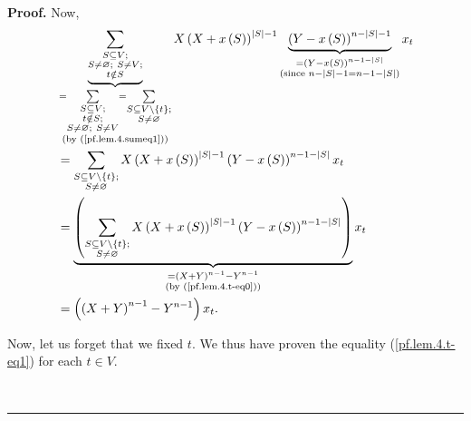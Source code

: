 \documentclass[numbers=enddot,12pt,final,onecolumn,notitlepage]{scrartcl}%
\theoremstyle{definition}
\newenvironment{proof}[1][Proof]{\noindent\textbf{#1.} }{\ \rule{0.5em}{0.5em}}
\let\sumnonlimits\sum
\renewcommand{\sum}{\sumnonlimits\limits}
\newenvironment{verlong}{}{}
\begin{document}
\begin{verlong}
\begin{proof}
Now,%
\begin{align}
&  \underbrace{\sum_{\substack{S\subseteq V;\\S\neq\varnothing;\ S\neq
V;\\t\notin S}}}_{\substack{=\sum_{\substack{S\subseteq V;\\t\notin
S;\\S\neq\varnothing;\ S\neq V}}=\sum_{\substack{S\subseteq V\setminus\left\{
t\right\}  ;\\S\neq\varnothing}}\\\text{(by (\ref{pf.lem.4.sumeq1}))}%
}}X\left(  X+x\left(  S\right)  \right)  ^{\left\vert S\right\vert
-1}\underbrace{\left(  Y-x\left(  S\right)  \right)  ^{n-\left\vert
S\right\vert -1}}_{\substack{=\left(  Y-x\left(  S\right)  \right)
^{n-1-\left\vert S\right\vert }\\\text{(since }n-\left\vert S\right\vert
-1=n-1-\left\vert S\right\vert \text{)}}}x_{t}\nonumber\\
&  =\sum_{\substack{S\subseteq V\setminus\left\{  t\right\}  ;\\S\neq
\varnothing}}X\left(  X+x\left(  S\right)  \right)  ^{\left\vert S\right\vert
-1}\left(  Y-x\left(  S\right)  \right)  ^{n-1-\left\vert S\right\vert }%
x_{t}\nonumber\\
&  =\underbrace{\left(  \sum_{\substack{S\subseteq V\setminus\left\{
t\right\}  ;\\S\neq\varnothing}}X\left(  X+x\left(  S\right)  \right)
^{\left\vert S\right\vert -1}\left(  Y-x\left(  S\right)  \right)
^{n-1-\left\vert S\right\vert }\right)  }_{\substack{=\left(  X+Y\right)
^{n-1}-Y^{n-1}\\\text{(by (\ref{pf.lem.4.t-eq0}))}}}x_{t}\nonumber\\
&  =\left(  \left(  X+Y\right)  ^{n-1}-Y^{n-1}\right)  x_{t}.
\label{pf.lem.4.t-eq1}%
\end{align}


Now, let us forget that we fixed $t$. We thus have proven the equality
(\ref{pf.lem.4.t-eq1}) for each $t\in V$.


\end{proof}
\end{verlong}
\end{document}
